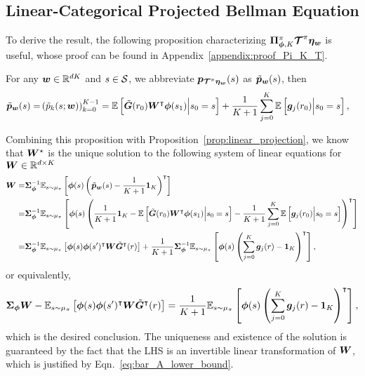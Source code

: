\subsection{Linear-Categorical Projected Bellman Equation}\label{subsection:proof_linear_cate_TD_equation}
To derive the result, the following proposition characterizing ${\bm{\Pi}}_{{\bm{\phi}}, K}^{\pi}\bm{\mathcal{T}}^{\pi}\bm{\eta}_{{\bm{w}}}$ is useful, whose proof can be found in Appendix~\ref{appendix:proof_Pi_K_T}.
\begin{proposition}\label{prop:Pi_K_T}
    For any ${\bm{w}}\in{\mathbb R}^{dK}$ and $s\in{\mathcal{S}}$, we abbreviate ${\bm{p}}_{\bm{\mathcal{T}}^{\pi}\bm{\eta}_{\bm{w}}}(s)$ as $\tilde{{\bm{p}}}_{{\bm{w}}}(s)$, then
    \begin{equation*}
    \begin{aligned}
             \tilde{{\bm{p}}}_{{\bm{w}}}(s)=&\left({\tilde{p}_k(s;{\bm{w}})}\right)_{k=0}^{K-1}={\mathbb E}\left[{\tilde{{\bm{G}}}(r_0) {\bm{W}}^{\intercal} {\bm{\phi}}(s_1)\Big| s_0=s }\right]+\frac{1}{K+1}\sum_{j=0}^K{\mathbb E}\left[{{\bm{g}}_j(r_0) \Big| s_0=s }\right],
    \end{aligned}
    \end{equation*}
\end{proposition}
Combining this proposition with Proposition~\ref{prop:linear_projection}, we know that ${\bm{W}}^{\star}$ is the unique solution to the following system of linear equations for ${\bm{W}}\in{\mathbb R}^{d\times K}$
\begin{equation*}
    \begin{aligned}
    {\bm{W}}=&{\bm{\Sigma}}_{{\bm{\phi}}}^{-1}{\mathbb E}_{s\sim\mu_{\pi}}\left[{{\bm{\phi}}(s)\left({\tilde{{\bm{p}}}_{{\bm{w}}}(s)-\frac{1}{K+1}\bm{1}_{K}}\right)^{\intercal}}\right]\\
    =&{\bm{\Sigma}}_{{\bm{\phi}}}^{-1}{\mathbb E}_{s\sim\mu_{\pi}}\left[{{\bm{\phi}}(s)\left({\frac{1}{K+1}\bm{1}_{K}-{\mathbb E}\left[{\tilde{{\bm{G}}}(r_0) {\bm{W}}^{\intercal} {\bm{\phi}}(s_1)\Big| s_0=s }\right]-\frac{1}{K+1}\sum_{j=0}^K{\mathbb E}\left[{{\bm{g}}_j(r_0) \Big| s_0=s }\right]}\right)^{\intercal}}\right]\\
    =&{\bm{\Sigma}}_{{\bm{\phi}}}^{-1}{\mathbb E}_{s\sim\mu_{\pi}}\left[{{\bm{\phi}}(s){\bm{\phi}}(s^\prime)^{\intercal}{\bm{W}}\tilde{{\bm{G}}}^{\intercal}(r)}\right]+   \frac{1}{K+1}{\bm{\Sigma}}_{{\bm{\phi}}}^{-1}{\mathbb E}_{s\sim\mu_{\pi}}\left[{{\bm{\phi}}(s)\left({\sum_{j=0}^K{\bm{g}}_j(r)-\bm{1}_{K}}\right)^{\intercal}}\right],
    \end{aligned}
\end{equation*}
or equivalently,
\begin{equation*}
    \begin{aligned}
    {\bm{\Sigma}}_{{\bm{\phi}}}{\bm{W}}-{\mathbb E}_{s\sim\mu_{\pi}}\left[{{\bm{\phi}}(s){\bm{\phi}}(s^\prime)^{\intercal}{\bm{W}}\tilde{{\bm{G}}}^{\intercal}(r)}\right]=   \frac{1}{K+1}{\mathbb E}_{s\sim\mu_{\pi}}\left[{{\bm{\phi}}(s)\left({\sum_{j=0}^K{\bm{g}}_j(r)-\bm{1}_{K}}\right)^{\intercal}}\right],
    \end{aligned}
\end{equation*}
which is the desired conclusion.
The uniqueness and existence of the solution is guaranteed by the fact that the LHS is an invertible linear transformation of ${\bm{W}}$, which is justified by Eqn.~\eqref{eq:bar_A_lower_bound}.

